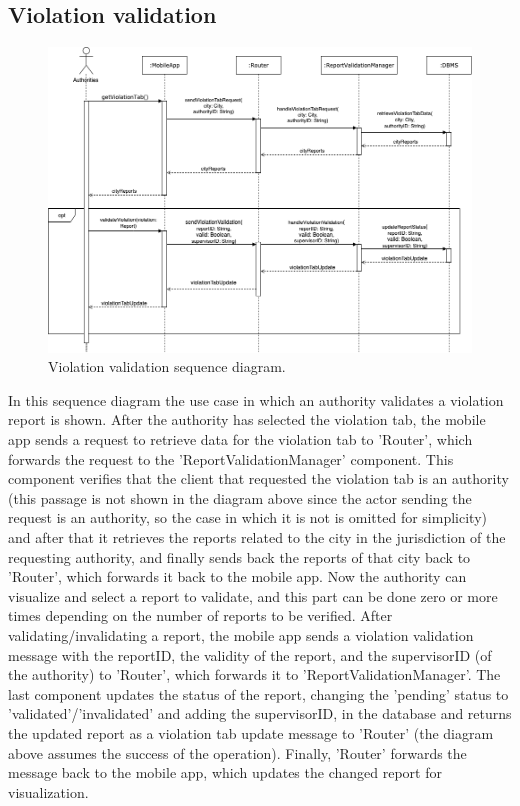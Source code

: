 \subsection{Violation validation}
\begin{figure}[H]
	\centering
	\includegraphics[width=\linewidth]{Images/SequenceDiagramViolationValidation}
	\caption{Violation validation sequence diagram.}
\end{figure}
In this sequence diagram the use case in which an authority validates a violation report is shown. After the authority has selected the violation tab, the mobile app sends a request to retrieve data for the violation tab to 'Router', which forwards the request to the 'ReportValidationManager' component. This component verifies that the client that requested the violation tab is an authority (this passage is not shown in the diagram above since the actor sending the request is an authority, so the case in which it is not is omitted for simplicity) and after that it retrieves the reports related to the city in the jurisdiction of the requesting authority, and finally sends back the reports of that city back to 'Router', which forwards it back to the mobile app. Now the authority can visualize and select a report to validate, and this part can be done zero or more times depending on the number of reports to be verified. After validating/invalidating a report, the mobile app sends a violation validation message with the reportID, the validity of the report, and the supervisorID (of the authority) to 'Router', which forwards it to 'ReportValidationManager'. The last component updates the status of the report, changing the 'pending' status to 'validated'/'invalidated' and adding the supervisorID, in the database and returns the updated report as a violation tab update message to 'Router' (the diagram above assumes the success of the operation). Finally, 'Router' forwards the message back to the mobile app, which updates the changed report for visualization.

